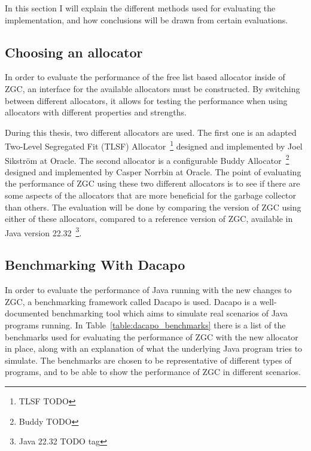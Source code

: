 In this section I will explain the different methods used for evaluating the implementation, and how conclusions will be drawn from certain evaluations.

\subsection{Choosing an allocator}
In order to evaluate the performance of the free list based allocator inside of ZGC, an interface for the available allocators must be constructed. By switching between different allocators, it allows for testing the performance when using allocators with different properties and strengths.

During this thesis, two different allocators are used. The first one is an adapted Two-Level Segregated Fit (TLSF) Allocator~\footnote{TLSF TODO} designed and implemented by Joel Sikström at Oracle. The second allocator is a configurable Buddy Allocator~\footnote{Buddy TODO} designed and implemented by Casper Norrbin at Oracle. The point of evaluating the performance of ZGC using these two different allocators is to see if there are some aspects of the allocators that are more beneficial for the garbage collector than others. The evaluation will be done by comparing the version of ZGC using either of these allocators, compared to a reference version of ZGC, available in Java version 22.32~\footnote{Java 22.32 TODO tag}.

\subsection{Benchmarking With Dacapo}
In order to evaluate the performance of Java running with the new changes to ZGC, a benchmarking framework called Dacapo is used. Dacapo is a well-documented benchmarking tool which aims to simulate real scenarios of Java programs running. In Table~\ref{table:dacapo_benchmarks} there is a list of the benchmarks used for evaluating the performance of ZGC with the new allocator in place, along with an explanation of what the underlying Java program tries to simulate. The benchmarks are chosen to be representative of different types of programs, and to be able to show the performance of ZGC in different scenarios.

